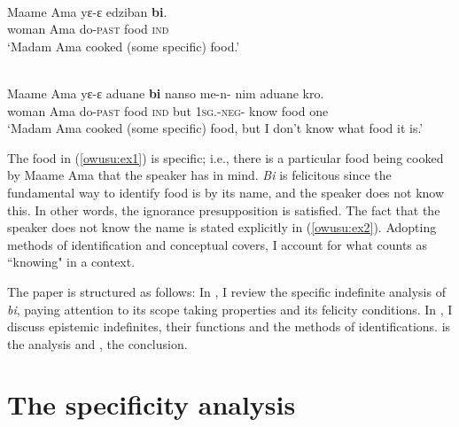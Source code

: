 \documentclass[output=paper,modfonts,nonflat,draftmode]{langsci/langscibook}
\begin{document}
\ea 
{}\\
\ea\label{owusu:ex1}

\gll Maame Ama yε-ε edziban \textbf{bi}. \\
     woman Ama do-\textsc{past} food  \textsc{ind}   \\
\glt `Madam Ama cooked (some specific) food.'

\ex\label{owusu:ex2}
\\
\gll  Maame Ama yε-ε aduane \textbf{bi} nanso me-n- nim aduane kro. \\
     woman Ama do-\textsc{past} food  \textsc{ind} but \textsc{1sg.}-\textsc{neg}- know food one \\ 
     \glt `Madam Ama cooked (some specific) food, but I don't know what food it is.'
     
\z \z 

The food in (\ref{owusu:ex1}) is specific; i.e., there is a particular food being cooked by Maame Ama that the speaker has in mind. \emph{Bi} is felicitous since the fundamental way to identify food is by its name, and the speaker does not know this. In other words, the ignorance presupposition is satisfied. The fact that the speaker does not know the name is stated explicitly in (\ref{owusu:ex2}). Adopting \citet{AloniPort2015} methods of identification and conceptual covers, I account for what counts as ``knowing" in a context.

The paper is structured as follows: In , I review the specific indefinite analysis of \emph{bi}, paying attention to its scope taking properties and its felicity conditions. In , I discuss epistemic indefinites, their functions and the methods of identifications.   is the analysis and , the conclusion.  


\section{The specificity analysis}
 
\end{document}
